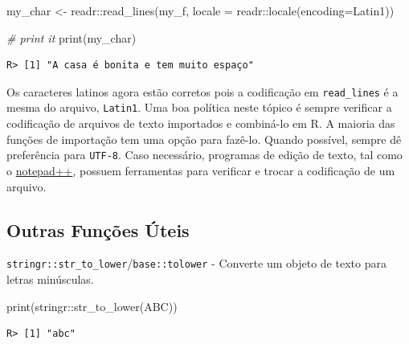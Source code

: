 \documentclass[
  11pt,
]{book}
\newenvironment{Shaded}{\begin{snugshade}}{\end{snugshade}}
\newcommand{\AttributeTok}[1]{\textcolor[rgb]{0.61,0.61,0.61}{#1}}
\newcommand{\CommentTok}[1]{\textcolor[rgb]{0.37,0.37,0.37}{\textit{#1}}}
\newcommand{\FunctionTok}[1]{\textcolor[rgb]{0,0,0}{#1}}
\newcommand{\NormalTok}[1]{#1}
\newcommand{\OtherTok}[1]{\textcolor[rgb]{0.37,0.37,0.37}{#1}}
\newcommand{\SpecialCharTok}[1]{\textcolor[rgb]{0,0,0}{#1}}
\newcommand{\StringTok}[1]{\textcolor[rgb]{0.5,0.5,0.5}{#1}}
\begin{document}
\begin{Shaded}
\begin{Highlighting}[]
\NormalTok{my\_char }\OtherTok{\textless{}{-}}\NormalTok{ readr}\SpecialCharTok{::}\FunctionTok{read\_lines}\NormalTok{(my\_f, }
                             \AttributeTok{locale =}\NormalTok{ readr}\SpecialCharTok{::}\FunctionTok{locale}\NormalTok{(}\AttributeTok{encoding=}\StringTok{\textquotesingle{}Latin1\textquotesingle{}}\NormalTok{))}

\CommentTok{\# print it}
\FunctionTok{print}\NormalTok{(my\_char)}
\end{Highlighting}
\end{Shaded}

\begin{verbatim}
R> [1] "A casa é bonita e tem muito espaço"
\end{verbatim}

Os caracteres latinos agora estão corretos pois a codificação em \texttt{read\_lines} é a mesma do arquivo, \texttt{\textquotesingle{}Latin1\textquotesingle{}}. Uma boa política neste tópico é sempre verificar a codificação de arquivos de texto importados e combiná-lo em R. A maioria das funções de importação tem uma opção para fazê-lo. Quando possível, sempre dê preferência para \texttt{\textquotesingle{}UTF-8\textquotesingle{}}. Caso necessário, programas de edição de texto, tal como o \href{https://notepad-plus-plus.org/}{notepad++}, possuem ferramentas para verificar e trocar a codificação de um arquivo.

\hypertarget{outras-funuxe7uxf5es-uxfateis-4}{%
\subsection{Outras Funções Úteis}\label{outras-funuxe7uxf5es-uxfateis-4}}

\texttt{stringr::str\_to\_lower}/\texttt{base::tolower} - Converte um objeto de texto para letras minúsculas.

\begin{Shaded}
\begin{Highlighting}[]
\FunctionTok{print}\NormalTok{(stringr}\SpecialCharTok{::}\FunctionTok{str\_to\_lower}\NormalTok{(}\StringTok{\textquotesingle{}ABC\textquotesingle{}}\NormalTok{))}
\end{Highlighting}
\end{Shaded}

\begin{verbatim}
R> [1] "abc"
\end{verbatim}
\end{document}
